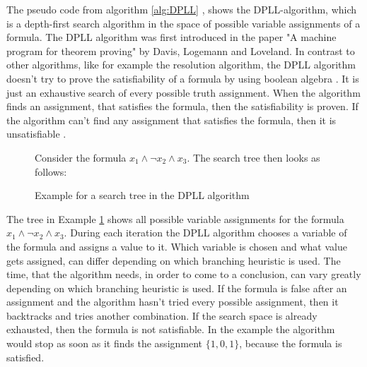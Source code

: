 The pseudo code from algorithm \ref{alg:DPLL} \cite{biere2009handbook}, shows the DPLL-algorithm, which is a depth-first search algorithm in the space of possible variable assignments of a formula. The DPLL algorithm was first introduced in the paper "A machine program for theorem proving" \cite{davis1962machine} by Davis, Logemann and Loveland. In contrast to other algorithms, like for example the resolution algorithm, the DPLL algorithm doesn't try to prove the satisfiability of a formula by using boolean algebra \cite{biere2009handbook}. It is just an exhaustive search of every possible truth assignment. When the algorithm finds an assignment, that satisfies the formula, then the satisfiability is proven. If the algorithm can't find any assignment that satisfies the formula, then it is unsatisfiable \cite{biere2009handbook}.

\begin{figure}[!htb]
\begin{leftbar}
Consider the formula $x_1 \wedge \neg x_2 \wedge x_3$. The search tree then looks as follows:\\
\centering
{}
\end{leftbar}
\caption{Example for a search tree in the DPLL algorithm}
\label{ex:SearchTree}
\end{figure}

The tree in Example \ref{ex:SearchTree} shows all possible variable assignments for the formula $x_1 \wedge \neg x_2 \wedge x_3$. During each iteration the DPLL algorithm chooses a variable of the formula and assigns a value to it. Which variable is chosen and what value gets assigned, can differ depending on which branching heuristic is used. The time, that the algorithm needs, in order to come to a conclusion, can vary greatly depending on which branching heuristic is used. If the formula is false after an assignment and the algorithm hasn't tried every possible assignment, then it backtracks and tries another combination. If the search space is already exhausted, then the formula is not satisfiable. In the example the algorithm would stop as soon as it finds the assignment $\{1,0,1\}$, because the formula is satisfied.

